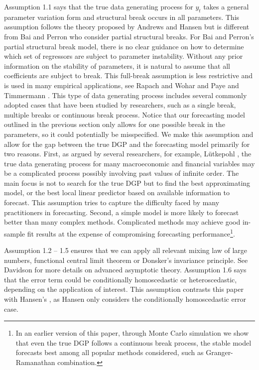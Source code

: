 Assumption 1.1 says that the true data generating process for $y_t$ takes a general parameter variation form and structural break occurs in all parameters. This assumption follows the theory proposed by Andrews and Hansen but is different from Bai and Perron who consider partial structural breaks. For Bai and Perron's \cite{bai_perron98} partial structural break model, there is no clear guidance on how to determine which set of regressors are subject to parameter instability. Without any prior information on the stability of parameters, it is natural to assume that all coefficients are subject to break. This full-break assumption is less restrictive and is used in many empirical applications, see Rapach and Wohar \cite{rapach_wohar_JFE2006} and Paye and Timmermann \cite{paye_timmermann_JEF2006}. This type of data generating process includes several commonly adopted cases that have been studied by researchers, such as a single break, multiple breaks or continuous break process. Notice that our forecasting model outlined in the previous section only allows for one possible break in the parameters, so it could potentially be misspecified. We make this assumption and allow for the gap between the true DGP and the forecasting model primarily for two reasons. First, as argued by several researchers, for example, L\"{u}tkepohl \cite{lutkepohl_textbook}, the true data generating process for many macroeconomic and financial variables may be a complicated process possibly involving past values of infinite order. The main focus is not to search for the true DGP but to find the best approximating model, or the best local linear predictor based on available information to forecast. This assumption tries to capture the difficulty faced by many practitioners in forecasting. Second, a simple model is more likely to forecast better than many complex methods. Complicated methods may achieve good in-sample fit results at the expense of compromising forecasting performance\footnote{In an earlier version of this paper, through Monte Carlo simulation we show that even the true DGP follows a continuous break process, the stable model forecasts best among all popular methods considered, such as Granger-Ramanathan combination.}.

Assumption 1.2 -- 1.5 ensures that we can apply all relevant mixing law of large numbers, functional central limit theorem or Donsker's invariance principle. See Davidson \cite{davidson_textbook} for more details on advanced asymptotic theory. Assumption 1.6 says that the error term could be conditionally homoscedastic or heteroscedastic, depending on the application of interest. This assumption contrasts this paper with Hansen's \cite{hansen2009averaging}, as Hansen only considers the conditionally homoscedastic error case.

